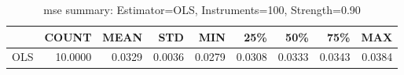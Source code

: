 \begin{table}[ht]
\centering
\caption{mse summary: Estimator=OLS, Instruments=100, Strength=0.90}
\begin{tabular}{lrrrrrrrr}
\toprule
 & COUNT & MEAN & STD & MIN & 25\% & 50\% & 75\% & MAX \\
\midrule
OLS & 10.0000 & 0.0329 & 0.0036 & 0.0279 & 0.0308 & 0.0333 & 0.0343 & 0.0384 \\
\bottomrule
\end{tabular}
\end{table}
